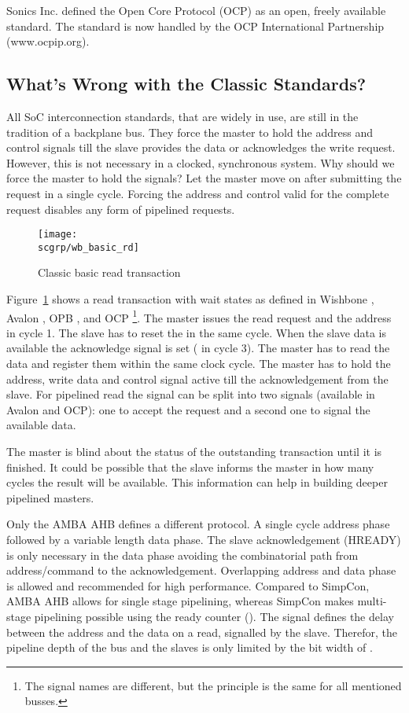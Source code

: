 Sonics Inc. defined the Open Core Protocol (OCP) \cite{soc:ocp} as
an open, freely available standard. The standard is now handled by
the OCP International Partnership (www.ocpip.org).




\subsection{What's Wrong with the Classic Standards?}

All SoC interconnection standards, that are widely in use, are still
in the tradition of a backplane bus. They force the master to hold
the address and control signals till the slave provides the data or
acknowledges the write request. However, this is not necessary in a
clocked, synchronous system. Why should we force the master to hold
the signals? Let the master move on after submitting the request in
a single cycle. Forcing the address and control valid for the
complete request disables any form of pipelined requests.


\begin{figure}
    \centering
    \texttt{[image: \\scgrp/wb\_basic\_rd]}
    \caption{Classic basic read transaction}
    \label{fig:wb:basic:rd}
\end{figure}

Figure~\ref{fig:wb:basic:rd} shows a read transaction with wait
states as defined in Wishbone \cite{soc:wishbone}, Avalon
\cite{soc:avalon}, OPB \cite{soc:opb}, and OCP
\cite{soc:ocp}\footnote{The signal names are different, but the
principle is the same for all mentioned busses.}. The master issues
the read request and the address in cycle 1. The slave has to reset
the  in the same cycle. When the slave data is available
the acknowledge signal is set ( in cycle 3). The master
has to read the data and register them within the same clock cycle.
The master has to hold the address, write data and control signal
active till the acknowledgement from the slave. For pipelined read
the  signal can be split into two signals (available in
Avalon and OCP): one to accept the request and a second one to
signal the available data.

The master is blind about the status of the outstanding transaction
until it is finished. It could be possible that the slave informs
the master in how many cycles the result will be available. This
information can help in building deeper pipelined masters.

Only the AMBA AHB \cite{soc:amba} defines a different protocol. A
single cycle address phase followed by a variable length data phase.
The slave acknowledgement (HREADY) is only necessary in the data
phase avoiding the combinatorial path from address/command to the
acknowledgement. Overlapping address and data phase is allowed and
recommended for high performance. Compared to SimpCon, AMBA AHB
allows for single stage pipelining, whereas SimpCon makes
multi-stage pipelining possible using the ready counter
(). The  signal defines the delay
between the address and the data on a read, signalled by the slave.
Therefor, the pipeline depth of the bus and the slaves is only
limited by the bit width of .


